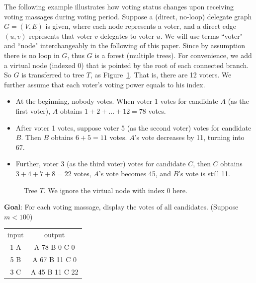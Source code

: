 The following example illustrates how voting status changes upon receiving voting massages during voting  period.
 Suppose a (direct, no-loop) delegate graph $G=(V,E)$ is given, where each node represents a voter, and a direct edge $(u,v)$ represents that voter $v$ delegates to voter $u$. We will use terms ``voter" and ``node" interchangeably in the following of this paper.  Since by assumption there is no
loop in $G$, thus $G$ is a forest (multiple trees). For convenience, we add a virtual node (indexed 0) that
is pointed by the root of each connected branch. So $G$ is transferred to tree $T$, as
Figure~\ref{fig:1}. That is, there are 12 voters. We further assume that each voter's voting power equals to his index. 

\begin{itemize}
\item At the beginning, nobody
votes. When voter 1 votes for candidate $A$ (as the first voter), $A$ obtains
$1+2+...+12=78$ votes.

\item After voter 1 votes, suppose voter 5 (as the second
voter) votes for candidate $B$. Then $B$ obtains $6+5=11$ votes. $A$'s vote
decreases by 11, turning into 67.

\item Further, voter 3 (as the third voter) votes for candidate $C$, then $C$
obtains $3+4+7+8=22$ votes, $A$'s vote becomes 45, and $B$'s vote is still 11.
\end{itemize}

\begin{figure}
  \centering
  
  	\caption{Tree $T$. We ignore the virtual node with index 0 here.}
  		\label{fig:1}
\end{figure}
\textbf{Goal}:
For each voting massage, display the votes of all candidates. (Suppose $m<100$)

\begin{tabular}{|c|c|}
input & output \\
1 A			&		A 78 B 0 C 0
\\
5 B			&		A 67 B 11 C 0
\\
3 C			&		A 45 B 11 C 22
\end{tabular}
